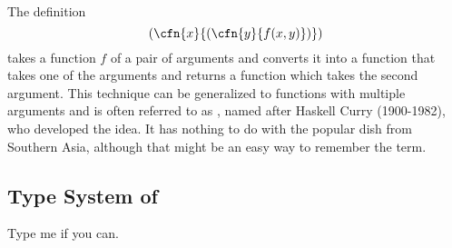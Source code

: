 


\begin{remark}~\\
The definition
\[(\cfn{x}{(\cfn{y}{f(x,y)})})\]
  takes a function $f$ of a pair of arguments and converts it
  into a function that takes one of the arguments and returns a
  function which takes the second argument.  This technique can be
  generalized to functions with multiple arguments and is often
  referred to as , named after Haskell Curry
  (1900-1982), who developed the idea.  It has nothing to do with the
  popular dish from Southern Asia, although that might be an easy way
  to remember the term.
\end{remark}


\subsection{Type System of \pml}

Type me if you can.







